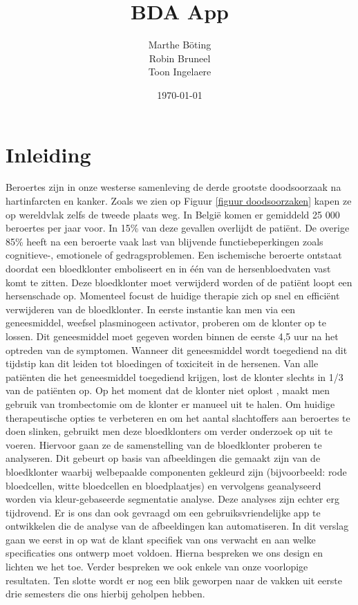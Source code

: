 \documentclass[a4paper,kulak]{kulakarticle}
\date{\today}
\title{BDA App}
\author{Marthe B\"{o}ting\\
	Robin Bruneel\\
	Toon Ingelaere}
\begin{document}
	
	\newpage
	
	\maketitle
	\section*{Inleiding}
		Beroertes zijn in onze westerse samenleving de derde grootste doodsoorzaak na hartinfarcten en kanker. Zoals we zien op Figuur \ref{figuur doodsoorzaken} kapen ze op wereldvlak zelfs de tweede plaats weg\cite{worldhealthorganization}. In België komen er gemiddeld 25 000 beroertes per jaar voor. In 15\% van deze gevallen overlijdt de patiënt. De overige 85\% heeft na een beroerte vaak last van blijvende functiebeperkingen zoals cognitieve-, emotionele of gedragsproblemen. Een ischemische beroerte ontstaat doordat een bloedklonter emboliseert en in één van de hersenbloedvaten vast komt te zitten. Deze bloedklonter moet verwijderd worden of de patiënt loopt een hersenschade op.
		Momenteel focust de huidige therapie zich op snel en efficiënt verwijderen van de bloedklonter. In eerste instantie kan men via een geneesmiddel, weefsel plasminogeen activator, proberen om de klonter op te lossen. Dit geneesmiddel moet gegeven worden binnen de eerste 4,5 uur na het optreden van de symptomen. Wanneer dit geneesmiddel wordt toegediend na dit tijdstip kan dit leiden tot bloedingen of toxiciteit in de hersenen. Van alle patiënten die het geneesmiddel toegediend krijgen, lost de klonter slechts in 1/3 van de patiënten op.
		Op het moment dat de klonter niet oplost , maakt men gebruik van trombectomie om de klonter er manueel uit te halen.
		Om huidige therapeutische opties te verbeteren en om het aantal slachtoffers aan beroertes te doen slinken, gebruikt men deze bloedklonters om verder onderzoek op uit te voeren. Hiervoor gaan ze de samenstelling van de bloedklonter proberen te analyseren. Dit gebeurt op basis van afbeeldingen die gemaakt zijn van de bloedklonter waarbij welbepaalde componenten gekleurd zijn (bijvoorbeeld: rode bloedcellen, witte bloedcellen en bloedplaatjes) en vervolgens geanalyseerd worden via kleur-gebaseerde segmentatie analyse.
		Deze analyses zijn echter erg tijdrovend. Er is ons dan ook gevraagd om een gebruiksvriendelijke app te ontwikkelen die de analyse van de afbeeldingen kan automatiseren.
		In dit verslag gaan we eerst in op wat de klant specifiek van ons verwacht en aan welke specificaties ons ontwerp moet voldoen. Hierna bespreken we ons design en lichten we het toe. Verder bespreken we ook enkele van onze voorlopige resultaten. Ten slotte wordt er nog een blik geworpen naar de vakken uit eerste drie semesters die ons hierbij geholpen hebben.
		
\end{document}
